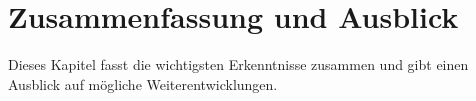 \chapter{Zusammenfassung und Ausblick}

Dieses Kapitel fasst die wichtigsten Erkenntnisse zusammen und gibt einen Ausblick auf mögliche Weiterentwicklungen.
